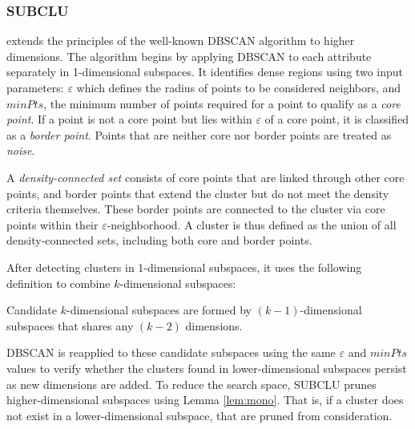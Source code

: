 \subsubsection{SUBCLU}
extends the principles of the well-known DBSCAN algorithm \cite{dbscan} to higher dimensions. The algorithm begins by applying DBSCAN to each attribute separately in 1-dimensional subspaces. It identifies dense regions using two input parameters: $\varepsilon$ which defines the radius of points to be considered neighbors, and $minPts$, the minimum number of points required for a point to qualify as a \textit{core point}. If a point is not a core point but lies within $\varepsilon$ of a core point, it is classified as a \textit{border point}. Points that are neither core nor border points are treated as \textit{noise}.

A \textit{density-connected set} consists of core points that are linked through other core points, and border points that extend the cluster but do not meet the density criteria themselves. These border points are connected to the cluster via core points within their $\varepsilon$-neighborhood. A cluster is thus defined as the union of all density-connected sets, including both core and border points.

After detecting clusters in 1-dimensional subspaces, it uses the following definition to combine $k$-dimensional subspaces:
\begin{definition}
    Candidate $k$-dimensional subspaces are formed by $(k-1)$-dimensional subspaces that shares any $(k-2)$ dimensions.
\end{definition}
DBSCAN is reapplied to these candidate subspaces using the same $\varepsilon$ and $minPts$ values to verify whether the clusters found in lower-dimensional subspaces persist as new dimensions are added. To reduce the search space, SUBCLU prunes higher-dimensional subspaces using Lemma \ref{lem:mono}. That is, if a cluster does not exist in a lower-dimensional subspace, that are pruned from consideration.

